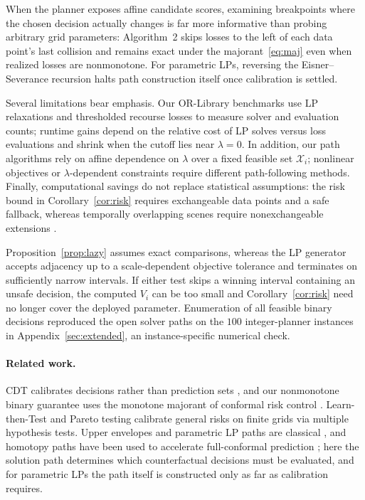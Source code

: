 \documentclass[a4paper,10pt]{article}
\theoremstyle{plain}
\theoremstyle{remark}
\begin{document}
When the planner exposes affine candidate scores, examining breakpoints where the chosen decision actually changes is far more informative than probing arbitrary grid parameters: Algorithm~2 skips losses to the left of each data point's last collision and remains exact under the majorant~\eqref{eq:maj} even when realized losses are nonmonotone. For parametric LPs, reversing the Eisner--Severance recursion \cite{eisner} halts path construction itself once calibration is settled.

Several limitations bear emphasis. Our OR-Library benchmarks use LP relaxations and thresholded recourse losses to measure solver and evaluation counts; runtime gains depend on the relative cost of LP solves versus loss evaluations and shrink when the cutoff lies near $\lambda=0$. In addition, our path algorithms rely on affine dependence on $\lambda$ over a fixed feasible set $\mathcal X_i$; nonlinear objectives or $\lambda$-dependent constraints require different path-following methods. Finally, computational savings do not replace statistical assumptions: the risk bound in Corollary~\ref{cor:risk} requires exchangeable data points and a safe fallback, whereas temporally overlapping scenes require nonexchangeable extensions \cite{nonexchangeable}.

Proposition~\ref{prop:lazy} assumes exact comparisons, whereas the LP generator accepts adjacency up to a scale-dependent objective tolerance and terminates on sufficiently narrow intervals. If either test skips a winning interval containing an unsafe decision, the computed $V_i$ can be too small and Corollary~\ref{cor:risk} need no longer cover the deployed parameter. Enumeration of all feasible binary decisions reproduced the open solver paths on the $100$ integer-planner instances in Appendix~\ref{sec:extended}, an instance-specific numerical check.

\paragraph{Related work.}
CDT calibrates decisions rather than prediction sets \cite{cdt}, and our nonmonotone binary guarantee uses the monotone majorant of conformal risk control \cite{crc}. Learn-then-Test \cite{ltt} and Pareto testing \cite{pareto} calibrate general risks on finite grids via multiple hypothesis tests. Upper envelopes and parametric LP paths are classical \cite{deberg,gusfield,eisner,megiddo}, and homotopy paths have been used to accelerate full-conformal prediction \cite{lei2019,li2024,speedcp}; here the solution path determines which counterfactual decisions must be evaluated, and for parametric LPs the path itself is constructed only as far as calibration requires.
\end{document}
